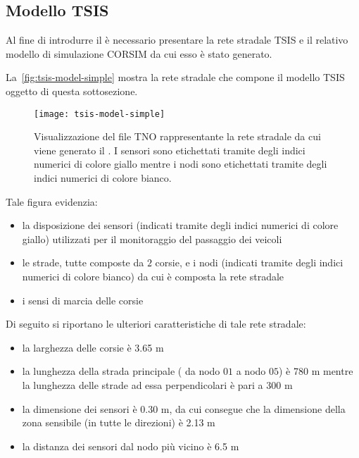 \subsection{Modello TSIS}\label{subsec:tsis-simple-model}
Al fine di introdurre il  è necessario presentare la rete stradale \acs{TSIS} e il relativo modello di simulazione \acs{CORSIM} da cui esso è stato generato.

La~\vref{fig:tsis-model-simple} mostra la rete stradale che compone il modello \acs{TSIS} oggetto di questa sottosezione.
\begin{figure}[H]
  	\centering
  	\texttt{[image: tsis-model-simple]}%
  	\caption[Rete stradale relativa al ]{Visualizzazione del file \acs{TNO} rappresentante la rete stradale da cui viene generato il . I sensori sono etichettati tramite degli indici numerici di colore giallo mentre i nodi sono etichettati tramite degli indici numerici di colore bianco.}
	\label{fig:tsis-model-simple}
\end{figure}
Tale figura evidenzia:
\begin{itemize}
	\item la disposizione dei sensori (indicati tramite degli indici numerici di colore giallo) utilizzati per il monitoraggio del passaggio dei veicoli
	\item le strade, tutte composte da $2$ corsie, e i nodi (indicati tramite degli indici numerici di colore bianco) da cui è composta la rete stradale
	\item i sensi di marcia delle corsie
\end{itemize}
Di seguito si riportano le ulteriori caratteristiche di tale rete stradale:
\begin{itemize}
	\item la larghezza delle corsie è \num{3.65} \si{\metre}
	\item la lunghezza della strada principale (\ie{} da nodo $01$ a nodo $05$) è \num{780} \si{\metre} mentre la lunghezza delle strade ad essa perpendicolari è pari a \num{300} \si{\metre}
	\item la dimensione dei sensori è \num{0.30} \si{\metre}, da cui consegue che la dimensione della zona sensibile (in tutte le direzioni) è \num{2.13} \si{\metre}
	\item la distanza dei sensori dal nodo più vicino è \num{6.5} \si{\metre}
\end{itemize}

